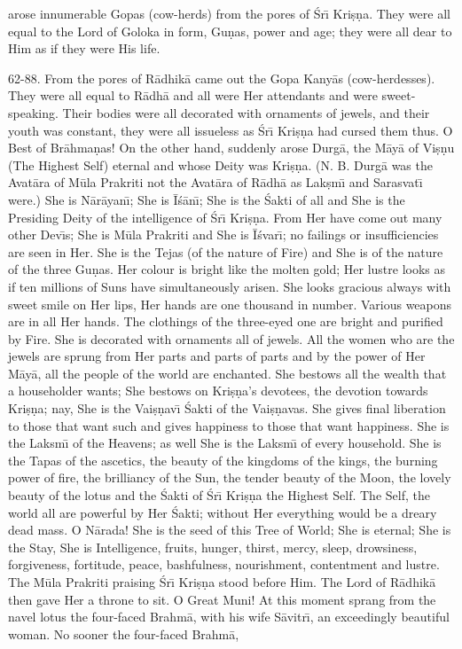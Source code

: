 arose innumerable Gopas (cow-herds) from the pores of \'Sr\={\i} Kri\d{s}\d{n}a. They were all equal to the Lord of Goloka in form, Gu\d{n}as, power and age; they were all dear to Him as if they were His life.

62-88. From the pores of R\=adhik\=a came out the Gopa Kany\=as (cow-herdesses). They were all equal to R\=adh\=a and all were Her attendants and were sweet-speaking. Their bodies were all decorated with ornaments of jewels, and their youth was constant, they were all issueless as \'Sr\={\i} Kri\d{s}\d{n}a had cursed them thus. O Best of Br\=ahma\d{n}as! On the other hand, suddenly arose Durg\=a, the M\=ay\=a of Vi\d{s}\d{n}u (The Highest Self) eternal and whose Deity was Kri\d{s}\d{n}a. (N. B. Durg\=a was the Avat\=ara of M\=ula Prakriti not the Avat\=ara of R\=adh\=a as Lak\d{s}m\={\i} and Sarasvat\={\i} were.) She is N\=ar\=ayan\={\i}; She is \=I\'s\=an\={\i}; She is the \'Sakti of all and She is the Presiding Deity of the intelligence of \'Sr\={\i} Kri\d{s}\d{n}a. From Her have come out many other Dev\={\i}s; She is M\=ula Prakriti and She is \=I\'svar\={\i}; no failings or insufficiencies are seen in Her. She is the Tejas (of the nature of Fire) and She is of the nature of the three Gu\d{n}as. Her colour is bright like the molten gold; Her lustre looks as if ten millions of Suns have simultaneously arisen. She looks gracious always with sweet smile on Her lips, Her hands are one thousand in number. Various weapons are in all Her hands. The clothings of the three-eyed one are bright and purified by Fire. She is decorated with ornaments all of jewels. All the women who are the jewels are sprung from Her parts and parts of parts and by the power of Her M\=ay\=a, all the people of the world are enchanted. She bestows all the wealth that a householder wants; She bestows on Kri\d{s}\d{n}a's devotees, the devotion towards Kri\d{s}\d{n}a; nay, She is the Vai\d{s}\d{n}av\={\i} \'Sakti of the Vai\d{s}\d{n}avas. She gives final liberation to those that want such and gives happiness to those that want happiness. She is the Laksm\={\i} of the Heavens; as well She is the Laksm\={\i} of every household. She is the Tapas of the ascetics, the beauty of the kingdoms of the kings, the burning power of fire, the brilliancy of the Sun, the tender beauty of the Moon, the lovely beauty of the lotus and the \'Sakti of \'Sr\={\i} Kri\d{s}\d{n}a the Highest Self. The Self, the world all are powerful by Her \'Sakti; without Her everything would be a dreary dead mass. O N\=arada! She is the seed of this Tree of World; She is eternal; She is the Stay, She is Intelligence, fruits, hunger, thirst, mercy, sleep, drowsiness, forgiveness, fortitude, peace, bashfulness, nourishment, contentment and lustre. The M\=ula Prakriti praising \'Sr\={\i} Kri\d{s}\d{n}a stood before Him. The Lord of R\=adhik\=a then gave Her a throne to sit. O Great Muni! At this moment sprang from the navel lotus the four-faced Brahm\=a, with his wife S\=avitr\={\i}, an exceedingly beautiful woman. No sooner the four-faced Brahm\=a,

